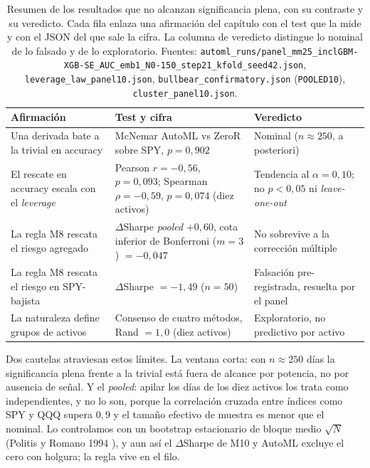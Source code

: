 \begin{table}[htbp]
\centering
\caption{Resumen de los resultados que no alcanzan significancia plena, con su contraste y su veredicto. Cada fila enlaza una afirmación del capítulo con el test que la mide y con el JSON del que sale la cifra. La columna de veredicto distingue lo nominal de lo falsado y de lo exploratorio. Fuentes: \texttt{automl\_runs/panel\_mm25\_inclGBM-XGB-SE\_AUC\_emb1\_N0-150\_step21\_kfold\_seed42.json}, \texttt{leverage\_law\_panel10.json}, \texttt{bullbear\_confirmatory.json} (\texttt{POOLED10}), \texttt{cluster\_panel10.json}.}
\label{tab:mp-limites}
\begin{tabular}{p{4.4cm}p{4.6cm}p{4.0cm}}
\toprule
Afirmación & Test y cifra & Veredicto \\
\midrule
Una derivada bate a la trivial en accuracy & McNemar AutoML vs ZeroR sobre SPY, $p = 0{,}902$ & Nominal ($n \approx 250$, a posteriori) \\
\addlinespace
El rescate en accuracy escala con el \emph{leverage} & Pearson $r = -0{,}56$, $p = 0{,}093$; Spearman $\rho = -0{,}59$, $p = 0{,}074$ (diez activos) & Tendencia al $\alpha = 0{,}10$; no $p < 0{,}05$ ni \emph{leave-one-out} \\
\addlinespace
La regla M8 rescata el riesgo agregado & $\Delta$Sharpe \emph{pooled} $+0{,}60$, cota inferior de Bonferroni ($m = 3$) $= -0{,}047$ & No sobrevive a la corrección múltiple \\
\addlinespace
La regla M8 rescata el riesgo en SPY-bajista & $\Delta$Sharpe $= -1{,}49$ ($n = 50$) & Falsación pre-registrada, resuelta por el panel \\
\addlinespace
La naturaleza define grupos de activos & Consenso de cuatro métodos, Rand $= 1{,}0$ (diez activos) & Exploratorio, no predictivo por activo \\
\bottomrule
\end{tabular}
\end{table}

Dos cautelas atraviesan estos límites. La ventana corta: con $n \approx 250$ días la significancia plena frente a la trivial está fuera de alcance por potencia, no por ausencia de señal. Y el \emph{pooled}: apilar los días de los diez activos los trata como independientes, y no lo son, porque la correlación cruzada entre índices como SPY y QQQ supera $0{,}9$ y el tamaño efectivo de muestra es menor que el nominal. Lo controlamos con un bootstrap estacionario de bloque medio $\sqrt{N}$ (Politis y Romano 1994 \cite{politis1994}), y aun así el $\Delta$Sharpe de M10 y AutoML excluye el cero con holgura; la regla vive en el filo.

